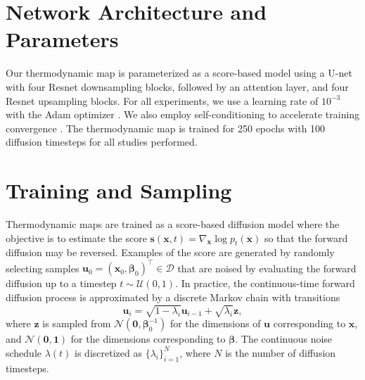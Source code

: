 
\section{Network Architecture and Parameters}
\label{ch4:app:architecture}

Our thermodynamic map is parameterized as a score-based model using a U-net \cite{unet} with four Resnet downsampling blocks, followed by an attention layer, and four Resnet upsampling blocks. For all experiments, we use a learning rate of $10^{-3}$ with the Adam optimizer \cite{Adam}. We also employ self-conditioning to accelerate training convergence \cite{ddpm-self-conditioning}. The thermodynamic map is trained for 250 epochs with 100 diffusion timesteps for all studies performed.

\section{Training and Sampling}
\label{ch4:app:tm-train-sample}

Thermodynamic maps are trained as a score-based diffusion model where the objective is to estimate the score $\mathbf{s}(\mathbf{x},t)=\nabla_{\mathbf{x}}\log p_t(\mathbf{x})$ so that the forward diffusion may be reversed. Examples of the score are generated by randomly selecting samples $\mathbf{u}_0 = (\mathbf{x}_0,\bm{\beta}_0)^\top \in \mathcal{D}$ that are noised by evaluating the forward diffusion up to a timestep $t \sim \mathcal{U}(0,1)$. In practice, the continuous-time forward diffusion process is approximated by a discrete Markov chain with transitions
\begin{equation}
    \label{ch4:eq:markov-chain}
    \mathbf{u}_i = \sqrt{1-\lambda_i} \mathbf{u}_{i-1} + \sqrt{\lambda_i} \mathbf{z},
\end{equation}
where $\mathbf{z}$ is sampled from $\mathcal{N}(\mathbf{0}, \bm\beta_0^{-1})$ for the dimensions of $\mathbf{u}$ corresponding to $\mathbf{x}$, and $\mathcal{N}(\mathbf{0}, \mathbf{1})$ for the dimensions corresponding to $\bm{\beta}$. The continuous noise schedule $\lambda(t)$ is discretized as $\{\lambda_i\}_{i=1}^N$, where $N$ is the number of diffusion timesteps.

